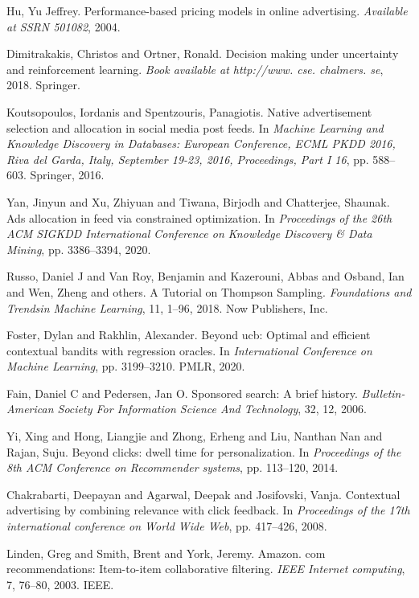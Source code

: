 \begin{thebibliography}{99}
 Hu, Yu Jeffrey. {P}erformance-based pricing models in online advertising. \textit{Available at SSRN 501082}, 2004.

 Dimitrakakis, Christos and Ortner, Ronald. {D}ecision making under uncertainty and reinforcement learning. \textit{Book available at http://www. cse. chalmers. se}, 2018. Springer.

 Koutsopoulos, Iordanis and Spentzouris, Panagiotis. {N}ative advertisement selection and allocation in social media post feeds. In \textit{Machine Learning and Knowledge Discovery in Databases: European Conference, ECML PKDD 2016, Riva del Garda, Italy, September 19-23, 2016, Proceedings, Part I 16}, pp. 588--603. Springer, 2016.

 Yan, Jinyun and Xu, Zhiyuan and Tiwana, Birjodh and Chatterjee, Shaunak. {A}ds allocation in feed via constrained optimization. In \textit{Proceedings of the 26th ACM SIGKDD International Conference on Knowledge Discovery \& Data Mining}, pp. 3386--3394, 2020.

 Russo, Daniel J and Van Roy, Benjamin and Kazerouni, Abbas and Osband, Ian and Wen, Zheng and others. {A} Tutorial on {T}hompson {S}ampling. \textit{Foundations and Trends\textregistered  in Machine Learning}, 11, 1--96, 2018. Now Publishers, Inc.

 Foster, Dylan and Rakhlin, Alexander. {B}eyond ucb: {O}ptimal and efficient contextual bandits with regression oracles. In \textit{International Conference on Machine Learning}, pp. 3199--3210. PMLR, 2020.

 Fain, Daniel C and Pedersen, Jan O. {S}ponsored search: {A} brief history. \textit{Bulletin-American Society For Information Science And Technology}, 32, 12, 2006.

 Yi, Xing and Hong, Liangjie and Zhong, Erheng and Liu, Nanthan Nan and Rajan, Suju. {B}eyond clicks: dwell time for personalization. In \textit{Proceedings of the 8th ACM Conference on Recommender systems}, pp. 113--120, 2014.

 Chakrabarti, Deepayan and Agarwal, Deepak and Josifovski, Vanja. {C}ontextual advertising by combining relevance with click feedback. In \textit{Proceedings of the 17th international conference on World Wide Web}, pp. 417--426, 2008.

 Linden, Greg and Smith, Brent and York, Jeremy. {A}mazon. com recommendations: {I}tem-to-item collaborative filtering. \textit{IEEE Internet computing}, 7, 76--80, 2003. IEEE.


\end{thebibliography}
